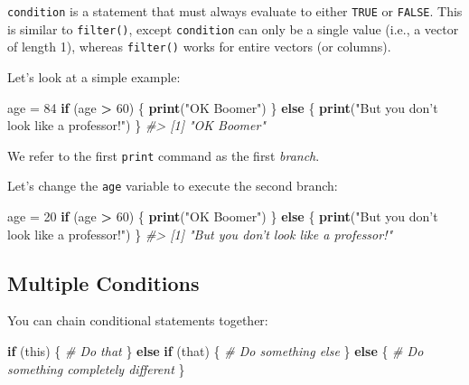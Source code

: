 \documentclass[]{book}
\newenvironment{Shaded}{\begin{snugshade}}{\end{snugshade}}
\newcommand{\KeywordTok}[1]{\textcolor[rgb]{0.13,0.29,0.53}{\textbf{#1}}}
\newcommand{\DecValTok}[1]{\textcolor[rgb]{0.00,0.00,0.81}{#1}}
\newcommand{\StringTok}[1]{\textcolor[rgb]{0.31,0.60,0.02}{#1}}
\newcommand{\CommentTok}[1]{\textcolor[rgb]{0.56,0.35,0.01}{\textit{#1}}}
\newcommand{\ControlFlowTok}[1]{\textcolor[rgb]{0.13,0.29,0.53}{\textbf{#1}}}
\newcommand{\OperatorTok}[1]{\textcolor[rgb]{0.81,0.36,0.00}{\textbf{#1}}}
\newcommand{\NormalTok}[1]{#1}
\begin{document}
\texttt{condition} is a statement that must always evaluate to either
\texttt{TRUE} or \texttt{FALSE}. This is similar to \texttt{filter()},
except \texttt{condition} can only be a single value (i.e., a vector of
length 1), whereas \texttt{filter()} works for entire vectors (or
columns).

Let's look at a simple example:

\begin{Shaded}
\begin{Highlighting}[]
\NormalTok{age =}\StringTok{ }\DecValTok{84}
\ControlFlowTok{if}\NormalTok{ (age }\OperatorTok{>}\StringTok{ }\DecValTok{60}\NormalTok{) \{}
    \KeywordTok{print}\NormalTok{(}\StringTok{"OK Boomer"}\NormalTok{)}
\NormalTok{\} }\ControlFlowTok{else}\NormalTok{ \{}
    \KeywordTok{print}\NormalTok{(}\StringTok{"But you don't look like a professor!"}\NormalTok{)}
\NormalTok{\}}
\CommentTok{#> [1] "OK Boomer"}
\end{Highlighting}
\end{Shaded}

We refer to the first \texttt{print} command as the first \emph{branch}.

Let's change the \texttt{age} variable to execute the second branch:

\begin{Shaded}
\begin{Highlighting}[]
\NormalTok{age =}\StringTok{ }\DecValTok{20}
\ControlFlowTok{if}\NormalTok{ (age }\OperatorTok{>}\StringTok{ }\DecValTok{60}\NormalTok{) \{}
    \KeywordTok{print}\NormalTok{(}\StringTok{"OK Boomer"}\NormalTok{)}
\NormalTok{\} }\ControlFlowTok{else}\NormalTok{ \{}
    \KeywordTok{print}\NormalTok{(}\StringTok{"But you don't look like a professor!"}\NormalTok{)}
\NormalTok{\}}
\CommentTok{#> [1] "But you don't look like a professor!"}
\end{Highlighting}
\end{Shaded}

\subsection{Multiple Conditions}\label{multiple-conditions}

You can chain conditional statements together:

\begin{Shaded}
\begin{Highlighting}[]
\ControlFlowTok{if}\NormalTok{ (this) \{}
  \CommentTok{# Do that}
\NormalTok{\} }\ControlFlowTok{else} \ControlFlowTok{if}\NormalTok{ (that) \{}
  \CommentTok{# Do something else}
\NormalTok{\} }\ControlFlowTok{else}\NormalTok{ \{}
  \CommentTok{# Do something completely different}
\NormalTok{\}}
\end{Highlighting}
\end{Shaded}
\end{document}
